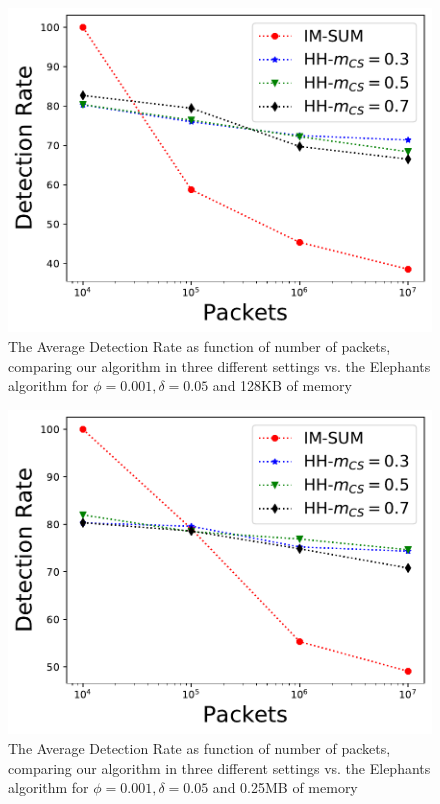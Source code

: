 \begin{figure}     \centering
    \includegraphics[width=\linewidth]{HH/figures/DR_per_pkts_m=0.125.pdf}
        \caption[Average Detection Rate for 128KB of memory]{The Average Detection Rate as function of number of packets, comparing our algorithm in three different settings vs. the Elephants algorithm for $\phi=0.001,\delta=0.05$ and 128KB of memory}
    \label{fig:fig2_c}
\end{figure}

\begin{figure}     \centering
    \includegraphics[width=\linewidth]{HH/figures/DR_per_pkts_m=0.25.pdf}
        \caption[Average Detection Rate for 0.25MB of memory]{The Average Detection Rate as function of number of packets, comparing our algorithm in three different settings vs. the Elephants algorithm for $\phi=0.001,\delta=0.05$ and 0.25MB of memory}
    \label{fig:fig2_d}
\end{figure}

